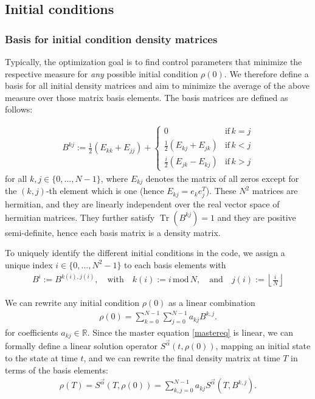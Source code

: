 \documentclass[letterpaper]{article}
\DeclareMathOperator{\Tr}{Tr}
\newcommand{\R}{\mathds{R}}
\begin{document}
\subsection{Initial conditions}\label{subsec:initcond}

\subsubsection{Basis for initial condition density matrices}
Typically, the optimization goal is to find control parameters that minimize the
respective measure for \textit{any} possible initial condition $\rho(0)$. We
therefore define a basis for all initial density matrices and aim to minimize
the average of the above measure over those matrix basis elements. The basis
matrices are defined as follows:

\begin{align}
B^{kj} := \frac 12 \left( E_{kk} + E_{jj}\right) +  \begin{cases} 
          0 & \text{if} \, k=j \\ 
        \frac 12 \left( E_{kj} + E_{jk}\right) & \text{if} \, k<j \\
        \frac i2 \left( E_{jk} - E_{kj}\right) & \text{if} \, k>j
      \end{cases} 
\end{align}
for all $k,j\in\{0,\dots, N-1\}$, where $E_{kj}$ denotes the matrix of all zeros
except for the $(k,j)$-th element which is one (hence $E_{kj} = e_ke_j^T$).
These $N^2$ matrices are hermitian, and they are linearly independent over the
real vector space of hermitian matrices. They further satisfy $\Tr(B^{kj}) = 1$
and they are positive semi-definite, hence each basis matrix is a density
matrix. 

To uniquely identify the different initial conditions in the code, we assign a
unique index $i \in \{0,\dots, N^2-1\}$ to each basis elements with 
\begin{align*}
  B^i := B^{k(i), j(i)}, \quad \text{with} \quad k(i) := i \,\mbox{mod}\, N,
  \quad \text{and} \quad j(i) := \left\lfloor \frac{i}{N} \right\rfloor
\end{align*}

We can rewrite any initial condition $\rho(0)$ as a linear combination 
\begin{align}
  \rho(0) = \sum_{k=0}^{N-1} \sum_{j=0}^{N-1} a_{kj} B^{k, j}.
\end{align}
for coefficients $a_{kj} \in \R$.
Since the master equation \eqref{mastereq} is linear, we can formally define a
linear solution operator $S^{\vec{\alpha}}(t,\rho(0))$, mapping an initial state
to the state at time $t$, and we can rewrite the final density matrix at time
$T$ in terms of the basis elements:
\begin{align}
  \rho(T) = S^{\vec{\alpha}}(T,\rho(0)) = \sum_{k,j=0}^{N-1} a_{kj}
  S^{\vec{\alpha}}(T,B^{k, j}).
\end{align}
\end{document}
